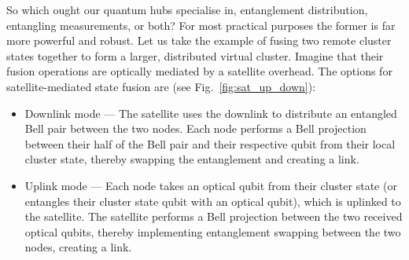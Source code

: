 So which ought our quantum hubs specialise in, entanglement distribution, entangling measurements, or both? For most practical purposes the former is far more powerful and robust. Let us take the example of fusing two remote cluster states together to form a larger, distributed virtual cluster. Imagine that their fusion operations are optically mediated by a satellite overhead. The options for satellite-mediated state fusion are (see Fig.~\ref{fig:sat_up_down}):
\begin{itemize}
	\item Downlink mode --- The satellite uses the downlink to distribute an entangled Bell pair between the two nodes. Each node performs a Bell projection between their half of the Bell pair and their respective qubit from their local cluster state, thereby swapping the entanglement and creating a link.
	\item Uplink mode --- Each node takes an optical qubit from their cluster state (or entangles their cluster state qubit with an optical qubit), which is uplinked to the satellite. The satellite performs a Bell projection between the two received optical qubits, thereby implementing entanglement swapping between the two nodes, creating a link.
\end{itemize}

